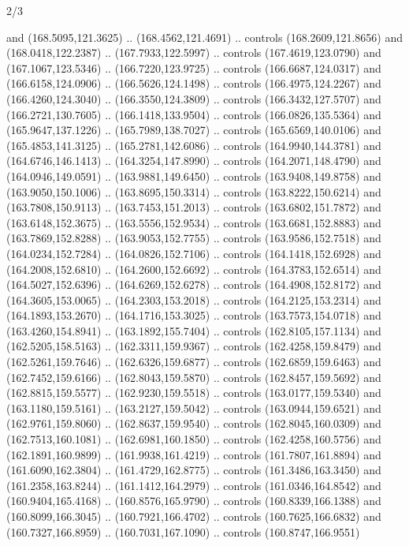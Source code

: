 \begin{flagdescription}{2/3}
\begin{scope}[shift={(0.5\flaglength,0.5)},scale=\flagwidth/320]
\begin{scope}[y=0.8pt, x=0.8pt, yscale=-1,shift={(-118.3,-146)}]
  and (168.5095,121.3625) .. (168.4562,121.4691) .. controls (168.2609,121.8656)
  and (168.0418,122.2387) .. (167.7933,122.5997) .. controls (167.4619,123.0790)
  and (167.1067,123.5346) .. (166.7220,123.9725) .. controls (166.6687,124.0317)
  and (166.6158,124.0906) .. (166.5626,124.1498) .. controls (166.4975,124.2267)
  and (166.4260,124.3040) .. (166.3550,124.3809) .. controls (166.3432,127.5707)
  and (166.2721,130.7605) .. (166.1418,133.9504) .. controls (166.0826,135.5364)
  and (165.9647,137.1226) .. (165.7989,138.7027) .. controls (165.6569,140.0106)
  and (165.4853,141.3125) .. (165.2781,142.6086) .. controls (164.9940,144.3781)
  and (164.6746,146.1413) .. (164.3254,147.8990) .. controls (164.2071,148.4790)
  and (164.0946,149.0591) .. (163.9881,149.6450) .. controls (163.9408,149.8758)
  and (163.9050,150.1006) .. (163.8695,150.3314) .. controls (163.8222,150.6214)
  and (163.7808,150.9113) .. (163.7453,151.2013) .. controls (163.6802,151.7872)
  and (163.6148,152.3675) .. (163.5556,152.9534) .. controls (163.6681,152.8883)
  and (163.7869,152.8288) .. (163.9053,152.7755) .. controls (163.9586,152.7518)
  and (164.0234,152.7284) .. (164.0826,152.7106) .. controls (164.1418,152.6928)
  and (164.2008,152.6810) .. (164.2600,152.6692) .. controls (164.3783,152.6514)
  and (164.5027,152.6396) .. (164.6269,152.6278) .. controls (164.4908,152.8172)
  and (164.3605,153.0065) .. (164.2303,153.2018) .. controls (164.2125,153.2314)
  and (164.1893,153.2670) .. (164.1716,153.3025) .. controls (163.7573,154.0718)
  and (163.4260,154.8941) .. (163.1892,155.7404) .. controls (162.8105,157.1134)
  and (162.5205,158.5163) .. (162.3311,159.9367) .. controls (162.4258,159.8479)
  and (162.5261,159.7646) .. (162.6326,159.6877) .. controls (162.6859,159.6463)
  and (162.7452,159.6166) .. (162.8043,159.5870) .. controls (162.8457,159.5692)
  and (162.8815,159.5577) .. (162.9230,159.5518) .. controls (163.0177,159.5340)
  and (163.1180,159.5161) .. (163.2127,159.5042) .. controls (163.0944,159.6521)
  and (162.9761,159.8060) .. (162.8637,159.9540) .. controls (162.8045,160.0309)
  and (162.7513,160.1081) .. (162.6981,160.1850) .. controls (162.4258,160.5756)
  and (162.1891,160.9899) .. (161.9938,161.4219) .. controls (161.7807,161.8894)
  and (161.6090,162.3804) .. (161.4729,162.8775) .. controls (161.3486,163.3450)
  and (161.2358,163.8244) .. (161.1412,164.2979) .. controls (161.0346,164.8542)
  and (160.9404,165.4168) .. (160.8576,165.9790) .. controls (160.8339,166.1388)
  and (160.8099,166.3045) .. (160.7921,166.4702) .. controls (160.7625,166.6832)
  and (160.7327,166.8959) .. (160.7031,167.1090) .. controls (160.8747,166.9551)

\end{scope}
\end{scope}
\end{flagdescription}
